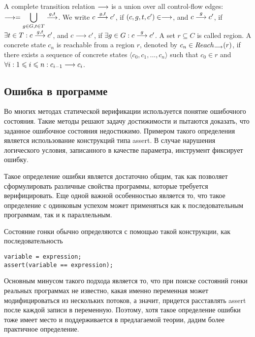 A complete transition relation $\longrightarrow$ is a union over all control-flow edges: 
$\longrightarrow = \displaystyle\bigcup_{g \in G,t \in T} \stackrel{g,t}{\longrightarrow}$.
We write $c \stackrel{g, t}{\longrightarrow} c'$, if $(c, g, t, c') \in \longrightarrow$, and
$c \stackrel{g}{\longrightarrow} c'$, if $\exists t\in T: c \stackrel{g,t}{\longrightarrow} c'$, and 
$c \longrightarrow c'$, if $\exists g\in G: c \stackrel{g}{\longrightarrow} c'$. 
A set $r \subseteq C$ is called region.
A concrete state $c_n$ is reachable from a region $r$, denoted by $c_n \in Reach_{\longrightarrow}(r)$, if there exists a sequence of concrete states $\langle c_0, c_1, ..., c_n \rangle$ such that $c_0 \in r$ and $\forall i : 1 \leqslant i \leqslant n : c_{i-1} \longrightarrow c_i$.



\subsection{Ошибка в программе}

Во многих методах статической верификации используется понятие ошибочного состояния. 
Такие методы решают задачу достижимости и пытаются доказать, что заданное ошибочное состояния недостижимо.
Примером такого определения является использование конструкций типа assert. 
В случае нарушения логического условия, записанного в качестве параметра, инструмент фиксирует ошибку.

Такое определение ошибки является достаточно общим, так как позволяет сформулировать различные свойства программы, которые требуется верифицировать. 
Еще одной важной особенностью является то, что такое определение с одинковым успехом может применяться как к последовательным программам, так и к параллельным. 

Состояние гонки обычно определяются с помощью такой конструкции, как последовательность

\begin{small}
\begin{lstlisting}
variable = expression;
assert(variable == expression);
\end{lstlisting}
\end{small}

Основным минусом такого подхода является то, что при поиске состояний гонки  реальных программах не известно, какая именно переменная может модифицироваться из нескольких потоков, а значит, придется расставлять assert после каждой записи в переменную. 
Поэтому, хотя такое определение ошибки тоже имеет место и поддерживается в предлагаемой теории, дадим более практичное определение.

